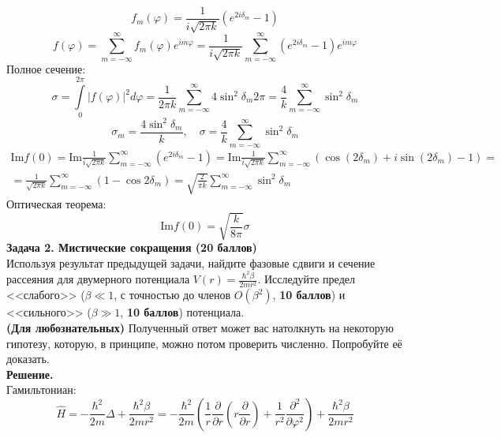 \documentclass[12pt]{article}
\theoremstyle{definition}
\begin{document}
\begin{equation}
    f_m(\varphi)=\frac{1}{i\sqrt{2\pi k}}(e^{2i\delta_m}-1)
\end{equation}
\begin{equation}
    \boxed{f(\varphi)=\sum\limits_{m=-\infty}^\infty f_m(\varphi)e^{im\varphi}=\frac{1}{i\sqrt{2\pi k}}\sum\limits_{m=-\infty}^\infty(e^{2i\delta_m}-1)e^{im\varphi}}
\end{equation}
Полное сечение:
\begin{equation}
    \sigma=\int\limits_0^{2\pi}|f(\varphi)|^2d\varphi=\frac{1}{2\pi k}\sum\limits_{m=-\infty}^{\infty}4\sin^2\delta_m2\pi=\frac{4}{k}\sum\limits_{m=-\infty}^{\infty}\sin^2\delta_m
\end{equation}
\begin{equation}
    \boxed{\sigma_m=\frac{4\sin^2\delta_m}{k},\quad \sigma=\frac{4}{k}\sum\limits_{m=-\infty}^{\infty}\sin^2\delta_m}
\end{equation}
\begin{multline}
    \text{Im}f(0)=\text{Im}\frac{1}{i\sqrt{2\pi k}}\sum\limits_{m=-\infty}^\infty(e^{2i\delta_m}-1)=\text{Im}\frac{1}{i\sqrt{2\pi k}}\sum\limits_{m=-\infty}^\infty(\cos(2\delta_m)+i\sin(2\delta_m)-1)=\\=\frac{1}{\sqrt{2\pi k}}\sum\limits_{m=-\infty}^\infty(1-\cos2\delta_m)=\sqrt{\frac{2}{\pi k}}\sum\limits_{m=-\infty}^\infty\sin^2\delta_m
\end{multline}
Оптическая теорема:
\begin{equation}
    \boxed{\text{Im}f(0)=\sqrt{\frac{k}{8\pi}}\sigma}
\end{equation}
\textbf{Задача 2. Мистические сокращения (20 баллов)}\\
Используя результат предыдущей задачи, найдите фазовые сдвиги и сечение рассеяния для двумерного потенциала $V(r) =\frac{\hbar^2\beta}{2mr^2}$. Исследуйте предел <<слабого>> ($\beta\ll 1$, с точностью до членов $O(\beta^2)$, \textbf{10 баллов}) и <<сильного>> ($\beta \gg 1$, \textbf{10 баллов}) потенциала.\\
\textbf{(Для любознательных)} Полученный ответ может вас натолкнуть на некоторую гипотезу, которую, в принципе,
можно потом проверить численно. Попробуйте её доказать.\\
\textbf{Решение.}\\
Гамильтониан:
\begin{equation}
    \hat{H}=-\frac{\hbar^2}{2m}\Delta+\frac{\hbar^2\beta}{2mr^2}=-\frac{\hbar^2}{2m}\left(\frac{1}{r}\frac{\partial}{\partial r}\left(r\frac{\partial}{\partial r}\right)+\frac{1}{r^2}\frac{\partial^2}{\partial\varphi^2}\right)+\frac{\hbar^2\beta}{2mr^2}
\end{equation}
\end{document}

